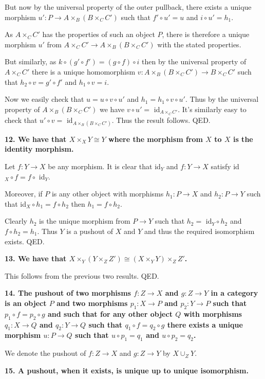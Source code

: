 \documentclass[12pt]{article}
\begin{document}
But now by the universal property of the outer pullback, there exists a unique morphism $u' : P \to A\times_B (B\times_C C')$ such that $f'\circ u' = u$ and $i\circ u' = h_1$.

As $A\times_C C'$ has the properties of such an object $P$, there is therefore a unique morphism $u'$ from $A\times_C C' \to A\times_B (B\times_C C')$ with the stated properties.

But similarly, as $k\circ(g'\circ f') = (g\circ f)\circ i$ then by the universal property of $A\times_C C'$ there is a unique homomorphism $v : A\times_B(B\times_C C') \to B\times_C C'$ such that $h_2\circ v = g'\circ f'$ and $h_1\circ v = i$.

Now we easily check that $u = u\circ v\circ u'$ and $h_1 = h_1\circ v \circ u'$. Thus by the universal property of $A\times_B(B\times_C C')$ we have $v\circ u' =$ id$_{A\times_C C'}$. It's similarly easy to check that $u'\circ v =$ id$_{A\times_B(B\times_C C')}$. Thus the result follows. QED. 

\textbf{12. We have that $X\times_X Y \cong Y$ where the morphism from $X$ to $X$ is the identity morphism.}

Let $f : Y \to X$ be any morphism. It is clear that id$_Y$ and $f : Y \to X$ satisfy id$_X\circ f = f\circ$ id$_Y$.

Moreover, if $P$ is any other object with morphisms $h_1 : P \to X$ and $h_2 : P \to Y$ such that id$_X\circ h_1 = f\circ h_2$ then $h_1 = f\circ h_2$.

Clearly $h_2$ is the unique morphism from $P \to Y$ such that $h_2 =$ id$_Y\circ h_2$ and $f\circ h_2 = h_1$. Thus $Y$ is a pushout of $X$ and $Y$ and thus the required isomorphism exists. QED. 

\textbf{13. We have that $X\times_Y(Y\times_Z Z') \cong (X\times_Y Y)\times_Z Z'$.}

This follows from the previous two results. QED.

\textbf{14. The pushout of two morphisms $f : Z \to X$ and $g : Z \to Y$ in a category is an object $P$ and two morphisms $p_1 : X \to P$ and $p_2 : Y \to P$ such that $p_1\circ f = p_2\circ g$ and such that for any other object $Q$ with morphisms $q_1 : X \to Q$ and $q_2 : Y \to Q$ such that $q_1\circ f = q_2\circ g$ there exists a unique morphism $u : P \to Q$ such that $u\circ p_1 = q_1$ and $u\circ p_2 = q_2$.}

We denote the pushout of $f : Z \to X$ and $g : Z \to Y$ by $X\cup_Z Y$.

\textbf{15. A pushout, when it exists, is unique up to unique isomorphism.}
\end{document}
